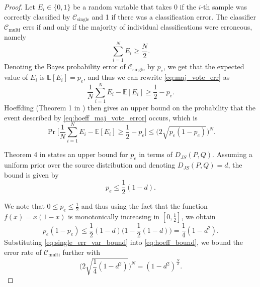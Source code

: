 \documentclass{article}
\begin{document}
\begin{proof}
Let $E_i\in\{0,1\}$ be a random variable that takes 0 if the $i$-th sample was correctly classified by $\mathcal{C}_{\text{single}}$ and 1 if there was a classification error. The classifier $\mathcal{C}_{\text{multi}}$ errs if and only if the majority of individual classifications were erroneous, namely
\begin{equation}
    \sum_{i=1}^{N}E_i\geq\frac{N}{2}.
\label{eq:maj_vote_err}
\end{equation}
Denoting the Bayes probability error of $\mathcal{C}_{\text{single}}$ by $p_e$, we get that the expected value of $E_i$ is $\mathbb{E}[E_i]=p_e$, and thus we can rewrite \eqref{eq:maj_vote_err} as
\begin{equation}
    \frac{1}{N}\sum_{i=1}^{N}E_i - \mathbb{E}[E_i]\geq \frac{1}{2}-p_e.
\label{eq:hoeff_maj_vote_error}
\end{equation}
Hoeffding (Theorem 1 in \cite{hoeffding_probability_1963}) then gives an upper bound on the probability that the event described by \eqref{eq:hoeff_maj_vote_error} occurs, which is
\begin{equation}
   \Pr\Big[\frac{1}{N}\sum_{i=1}^{N}E_i - \mathbb{E}[E_i]\geq \frac{1}{2}-p_e \Big] \leq \Big(2\sqrt{p_e(1-p_e)}\Big)^{N}.
\label{eq:hoeff_bound}
\end{equation}

Theorem 4 in \cite{lin_divergence_1991} states an upper bound for $p_e$ in terms of $D_{JS}(P,Q)$. Assuming a uniform prior over the source distribution and denoting $D_{JS}(P,Q)=d$, the bound is given by
\begin{equation}
    p_e\leq\frac{1}{2}(1 - d).
\label{eq:lin_bound}
\end{equation}

We note that $0\leq p_e\leq \frac{1}{2}$ and thus using the fact that the function $f(x)=x(1-x)$ is monotonically increasing in $[0,\frac{1}{2}]$, we obtain
\begin{equation}
    p_e(1-p_e) \leq \frac{1}{2}(1-d) \Big(1 - \frac{1}{2}(1-d) \Big) = \frac{1}{4}(1-d^{2}).
\label{eq:single_err_var_bound}
\end{equation}
Substituting \eqref{eq:single_err_var_bound} into \eqref{eq:hoeff_bound}, we bound the error rate of $\mathcal{C}_{\text{multi}}$ further with
\begin{equation}
    \Bigg(2\sqrt{\frac{1}{4}(1-d^{2})}\Bigg)^{N} = (1-d^2)^\frac{N}{2}.
\label{eq:multi_err_djs_bound}
\end{equation}


\end{proof}
\end{document}
